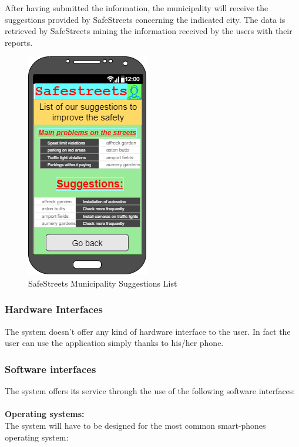 \documentclass[titlepage]{article}
\begin{document}
\begin{itemize}
\begin{itemize}
	\newpage
	
	
	
	After having submitted the information, the municipality will receive the suggestions provided by SafeStreets concerning the indicated city. The data is retrieved by SafeStreets mining the information received by the users with their reports.
	
	
	\begin{figure}[h]
	\includegraphics[scale=0.95]{Mockups/List of suggestions.png}
	\centering
	\caption{SafeStreets Municipality Suggestions List}
	\end{figure}
	\FloatBarrier
	
	\newpage
	
		
		
	\end{itemize}

		
		
	\end{itemize}
	
\subsubsection{Hardware Interfaces }
The system doesn't offer any kind of hardware interface to the user. In fact the user can use the application simply thanks to his/her phone.
\subsubsection{Software interfaces }
The system offers its service through the use of the following software interfaces:\\ \\
\textbf{Operating systems:\\ }
The system will have to be designed for the most common smart-phones operating system: 
	
\end{document}
